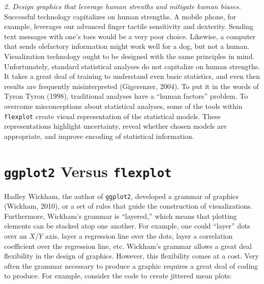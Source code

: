 \documentclass[
  doc]{apa6}
\begin{document}
\emph{2. Design graphics that leverage human strenths and mitigate human biases.} Successful technology capitalizes on human strengths. A mobile phone, for example, leverages our advanced finger tactile sensitivity and dexterity. Sending text messages with one's toes would be a very poor choice. Likewise, a computer that sends olefactory information might work well for a dog, but not a human. Visualization technology ought to be designed with the same principles in mind. Unfortunately, standard statistical analyses do not capitalize on human strengths. It takes a great deal of training to understand even basic statistics, and even then results are frequently misinterpreted (Gigerenzer, 2004). To put it in the words of Tyron Tyron (1998), traditional analyses have a \enquote{human factors} problem. To overcome misconceptions about statistical analyses, some of the tools within \texttt{flexplot} create visual representation of the statistical models. These representations highlight uncertainty, reveal whether chosen models are appropriate, and improve encoding of statistical information.

\hypertarget{ggplot2-versus-flexplot}{%
\section{\texorpdfstring{\texttt{ggplot2} Versus \texttt{flexplot}}{ggplot2 Versus flexplot}}\label{ggplot2-versus-flexplot}}

Hadley Wickham, the author of \texttt{ggplot2}, developed a grammar of graphics (Wickham, 2010), or a set of rules that guide the construction of visualizations. Furthermore, Wickham's grammar is \enquote{layered,} which means that plotting elements can be stacked atop one another. For example, one could \enquote{layer} dots over an \(X/Y\) axis, layer a regression line over the dots, layer a correlation coefficient over the regression line, etc. Wickham's grammar allows a great deal flexibility in the design of graphics. However, this flexibility comes at a cost. Very often the grammar necessary to produce a graphic requires a great deal of coding to produce. For example, consider the code to create jittered mean plots:
\end{document}
